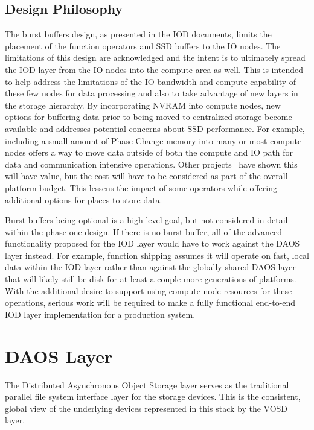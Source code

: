 \documentclass[conference]{IEEEtran} \pdfpagewidth=8.5in
\begin{document}
\subsection{Design Philosophy}

The burst buffers design, as presented in the IOD documents, limits the
placement of the function operators and SSD buffers to the IO nodes. The
limitations of this design are acknowledged and the intent is to ultimately
spread the IOD layer from the IO nodes into the compute area as well.  This is
intended to help address the limitations of the IO bandwidth and compute
capability of these few nodes for data processing and also to take advantage
of new layers in the storage hierarchy. By incorporating NVRAM into compute
nodes, new options for buffering data prior to being moved to centralized
storage become available and addresses potential concerns about SSD
performance. For example, including a small amount of Phase Change memory into
many or most compute nodes offers a way to move data outside of both the
compute and IO path for data and communication intensive operations. Other
projects~\cite{zheng:2010:predata} have shown this will have value, but the
cost will have to be considered as part of the overall platform budget. This
lessens the impact of some operators while offering additional options for
places to store data.

Burst buffers being optional is a high level goal, but not considered in detail
within the phase one design. If there is no burst buffer, all of the advanced
functionality proposed for the IOD layer would have to work against the DAOS
layer instead. For example, function shipping assumes it will operate on fast,
local data within the IOD layer rather than against the globally shared DAOS
layer that will likely still be disk for at least a couple more generations of
platforms. With the additional desire to support using compute node resources
for these operations, serious work will be required to make a fully functional
end-to-end IOD layer implementation for a production system.

\section{DAOS Layer}
\label{sec:daos}

The Distributed Asynchronous Object Storage layer serves as the traditional
parallel file system interface layer for the storage devices. This is the
consistent, global view of the underlying devices represented in this stack
by the VOSD layer.
\end{document}
